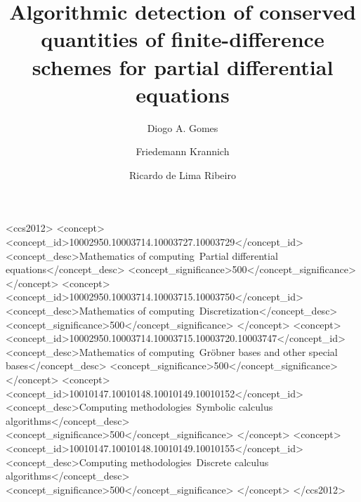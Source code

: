 \documentclass[manuscript]{acmart}
\newcommand{\1}{{\chi}}
\numberwithin{equation}{section}
\theoremstyle{thmlemcorr}
\numberwithin{theorem}{section}
\theoremstyle{thmlemcorr*}
\theoremstyle{defi}
\theoremstyle{remexample}
\theoremstyle{ass}
\begin{document}
\title[Detection of conserved quantities for PDE schemes]{Algorithmic detection of conserved quantities of finite-difference schemes for partial differential equations}

\author{Diogo A. Gomes}
\author{Friedemann Krannich}
\author{Ricardo de Lima Ribeiro}



\begin{CCSXML}
	<ccs2012>
	<concept>
	<concept_id>10002950.10003714.10003727.10003729</concept_id>
	<concept_desc>Mathematics of computing~Partial differential equations</concept_desc>
	<concept_significance>500</concept_significance>
	</concept>
	<concept>
	<concept_id>10002950.10003714.10003715.10003750</concept_id>
	<concept_desc>Mathematics of computing~Discretization</concept_desc>
	<concept_significance>500</concept_significance>
	</concept>
	<concept>
	<concept_id>10002950.10003714.10003715.10003720.10003747</concept_id>
	<concept_desc>Mathematics of computing~Gr{\"o}bner bases and other special bases</concept_desc>
	<concept_significance>500</concept_significance>
	</concept>
	<concept>
	<concept_id>10010147.10010148.10010149.10010152</concept_id>
	<concept_desc>Computing methodologies~Symbolic calculus algorithms</concept_desc>
	<concept_significance>500</concept_significance>
	</concept>
	<concept>
	<concept_id>10010147.10010148.10010149.10010155</concept_id>
	<concept_desc>Computing methodologies~Discrete calculus algorithms</concept_desc>
	<concept_significance>500</concept_significance>
	</concept>
	</ccs2012>
\end{CCSXML}

\end{document}
